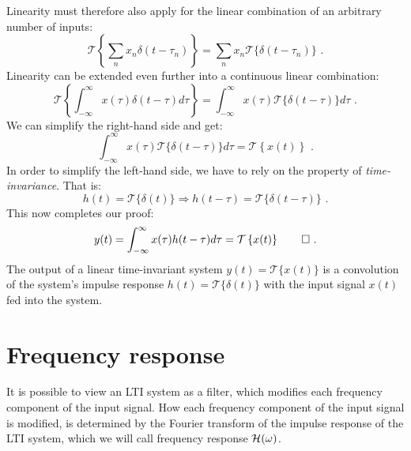 Linearity must therefore also apply for the linear combination of an arbitrary number of inputs:
\begin{equation}
\mathcal{T}\left\{\sum_n x_n \delta(t-\tau_n)\right\} = \sum_n x_n \mathcal{T}\{\delta(t-\tau_n)\}\,\,.
\end{equation}
Linearity can be extended even further into a continuous linear combination:
\begin{equation}
\mathcal{T}\left\{\int_{-\infty}^{\infty} x(\tau)\delta(t-\tau)d\tau\right\} = \int_{-\infty}^{\infty} x(\tau) \mathcal{T}\{\delta(t-\tau)\} d\tau\,\,.
\end{equation}
We can simplify the right-hand side and get:
\begin{equation}
\int_{-\infty}^{\infty} x(\tau) \mathcal{T}\{\delta(t-\tau)\} d\tau = \mathcal{T}\left\{x(t)\right\}\,\,.
\end{equation}
In order to simplify the left-hand side, we have to rely on the property of \emph{time-invariance}. That is:
\begin{equation}
h(t) = \mathcal{T}\{\delta(t)\} \Rightarrow h(t-\tau) = \mathcal{T}\{\delta(t-\tau)\}\,\,.
\end{equation}
This now completes our proof:
\begin{equation}
y(t)=\int_{-\infty}^{\infty} x(\tau) h(t-\tau) d\tau = \mathcal{T}\left\{x(t)\right\}\qed\,\,.
\end{equation}
The output of a linear time-invariant system $y(t)=\mathcal{T}\{x(t)\}$ is a convolution of the system's 
impulse response $h(t)=\mathcal{T}\{\delta(t)\}$ with the input signal $x(t)$ fed into the system.

\section{Frequency response}
It is possible to view an LTI system as a filter, which modifies each frequency component of the input signal. 
How each frequency component of the input signal is modified, is determined by the Fourier 
transform of the impulse response of the LTI system, which we will call  frequency response $\mathcal{H}(\omega)$.

